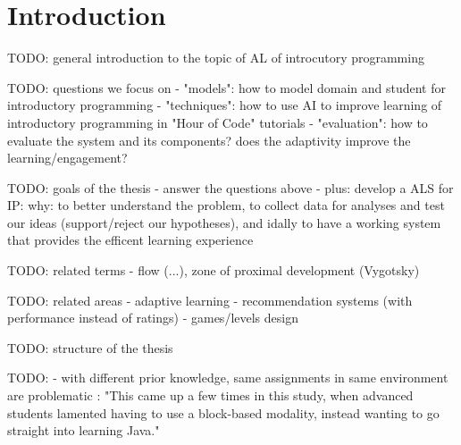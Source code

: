 \chapter{Introduction}
\label{chap:introduction}

TODO: general introduction to the topic of AL of introcutory programming

TODO: questions we focus on
- "models": how to model domain and student for introductory programming
- "techniques": how to use AI to improve learning of introductory programming
  in "Hour of Code" tutorials
- "evaluation": how to evaluate the system and its components?
  does the adaptivity improve the learning/engagement?

TODO: goals of the thesis
- answer the questions above
- plus: develop a ALS for IP: why: to better understand the problem,
  to collect data for analyses and test our ideas (support/reject our hypotheses),
  and idally to have a working system that provides the efficent learning experience

TODO: related terms
- flow (...), zone of proximal development (Vygotsky)


TODO: related areas
- adaptive learning
- recommendation systems (with performance instead of ratings)
- games/levels design


TODO: structure of the thesis


TODO:
- with different prior knowledge, same assignments in same environment are problematic
\cite{comparing-blocks-text-weintrop2017}:
"This came up a few times in this study, when advanced students lamented
having to use a block-based modality, instead wanting to go straight into learning Java."
